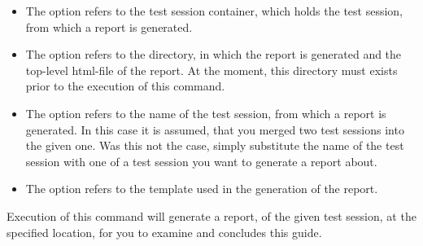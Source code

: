 \begin{itemize}
\item The option  refers to the test session container, which holds the test session, from which a report is generated.
\item The option  refers to the directory, in which the report is generated and the top-level html-file of the report. At the moment, this directory must exists prior to the execution of this command.
\item The option  refers to the name of the test session, from which a report is generated. In this case it is assumed, that you merged two test sessions into the given one. Was this not the case, simply substitute the name of the test session with one of a test session you want to generate a report about.
\item The option  refers to the template used in the generation of the report.
\end{itemize}
Execution of this command will generate a report, of the given test session, at the specified location, for you to examine and concludes this guide.